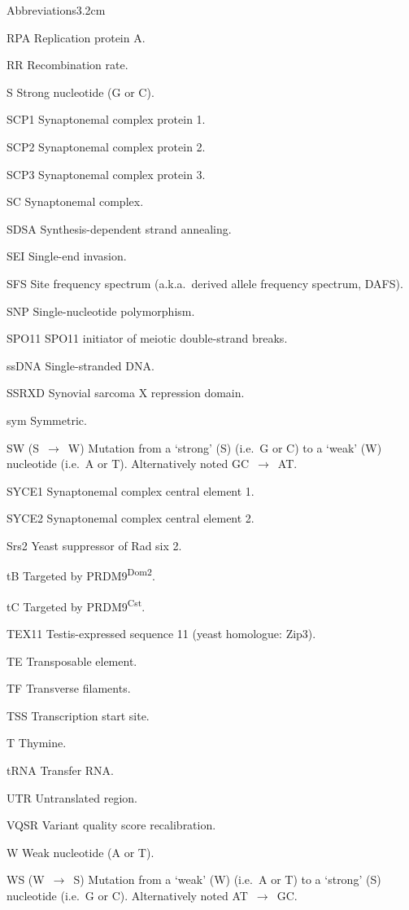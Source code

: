 \begin{mclistof}{Abbreviations}{3.2cm}
\item[RPA] Replication protein A\@.
\item[RR] Recombination rate.
\item[S] Strong nucleotide (G or C).
\item[SCP1] Synaptonemal complex protein 1.
\item[SCP2] Synaptonemal complex protein 2.
\item[SCP3] Synaptonemal complex protein 3.
\item[SC] Synaptonemal complex.
\item[SDSA] Synthesis-dependent strand annealing.
\item[SEI] Single-end invasion.
\item[SFS] Site frequency spectrum (a.k.a.\ derived allele frequency spectrum, DAFS).
\item[SNP] Single-nucleotide polymorphism.
\item[SPO11] SPO11 initiator of meiotic double-strand breaks.
\item[ssDNA] Single-stranded DNA\@.
\item[SSRXD] Synovial sarcoma X repression domain.
\item[sym] Symmetric.
\item[SW (S~$\rightarrow$~W)] Mutation from a ‘strong’ (S) (i.e.\ G or C) to a ‘weak’ (W) nucleotide (i.e.\ A or T). Alternatively noted GC~$\rightarrow$~AT\@.
\item[SYCE1] Synaptonemal complex central element 1.
\item[SYCE2] Synaptonemal complex central element 2.
\item[Srs2] Yeast suppressor of Rad six 2.
\item[tB] Targeted by PRDM9\textsuperscript{Dom2}.
\item[tC] Targeted by PRDM9\textsuperscript{Cst}.
\item[TEX11] Testis-expressed sequence 11 (yeast homologue: Zip3).
\item[TE] Transposable element.
\item[TF] Transverse filaments.
\item[TSS] Transcription start site.
\item[T] Thymine.
\item[tRNA] Transfer RNA\@.
\item[UTR] Untranslated region.
\item[VQSR] Variant quality score recalibration.
\item[W] Weak nucleotide (A or T).
\item[WS (W~$\rightarrow$~S)] Mutation from a ‘weak’ (W) (i.e.\ A or T) to a ‘strong’ (S) nucleotide (i.e.\ G or C). Alternatively noted AT~$\rightarrow$~GC\@.

\end{mclistof}
